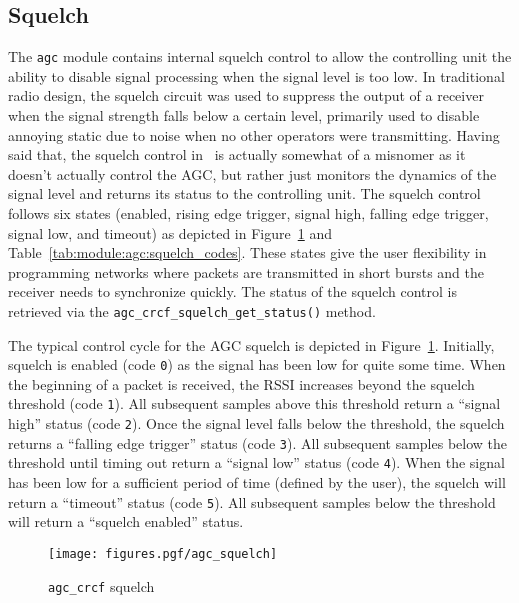 \subsection{Squelch}
The {\tt agc} module contains internal squelch control to allow the
controlling unit the ability to disable signal processing when the signal
level is too low.
In traditional radio design, the squelch circuit was used to suppress the
output of a receiver when the signal strength falls below a certain level,
primarily used to disable annoying static due to noise when no other operators
were transmitting.
Having said that, the squelch control in \liquid\ is actually somewhat of a
misnomer as it doesn't actually control the AGC, but rather just monitors the
dynamics of the signal level and returns its status to the controlling unit.
The squelch control follows six states
(enabled, rising edge trigger, signal high, falling edge trigger,
signal low, and timeout)
as depicted in
Figure~\ref{fig:module:agc:squelch} and
Table~\ref{tab:module:agc:squelch_codes}.
These states give the user flexibility in programming networks where packets
are transmitted in short bursts and the receiver needs to synchronize quickly.
The status of the squelch control is retrieved via the
{\tt agc\_crcf\_squelch\_get\_status()} method.

The typical control cycle for the AGC squelch is depicted in
Figure~\ref{fig:module:agc:squelch}.
Initially, squelch is enabled (code {\tt 0}) as the signal has been low for
quite some time.
When the beginning of a packet is received, the RSSI increases beyond the
squelch threshold (code {\tt 1}).
All subsequent samples above this threshold return a ``signal high'' status
(code {\tt 2}).
Once the signal level falls below the threshold, the squelch returns a
``falling edge trigger'' status (code {\tt 3}).
All subsequent samples below the threshold until timing out return a ``signal
low'' status (code {\tt 4}).
When the signal has been low for a sufficient period of time (defined by the
user), the squelch will return a ``timeout'' status (code {\tt 5}).
All subsequent samples below the threshold will return a ``squelch enabled''
status.

\begin{figure}
\centering
  \texttt{[image: figures.pgf/agc\_squelch]}
\caption{{\tt agc\_crcf} squelch}
\label{fig:module:agc:squelch}
\end{figure}


